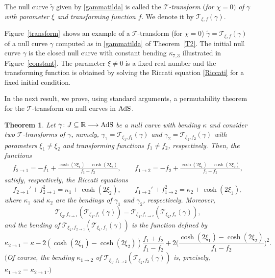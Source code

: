 \documentclass[10pt,a4paper]{amsart}
\numberwithin{equation}{section}
\newtheorem{Theorem}{Theorem}[section]
\def\bending{\kappa}
\def\R{\mathbb{R}}
\def\AdS{{\rm AdS}}
\begin{document}
\begin{Definition} The null curve $\widetilde{\gamma}$ given by \eqref{gammatilda} is called the \emph{$\mathcal{T}$-transform $($for $\chi=0)$ of $\gamma$ with parameter $\xi$ and transforming function $f$}. We denote it by $\mathcal{T}_{\xi,f}(\gamma)$.
\end{Definition}

Figure~\ref{transform} shows an example of a $\mathcal{T}$-transform (for $\chi=0$) $\widetilde{\gamma}=\mathcal{T}_{\xi,f}(\gamma)$ of a null curve $\gamma$ computed as in \eqref{gammatilda} of Theorem~\ref{T2}. The initial null curve $\gamma$ is the closed null curve with constant bending $\bending_{7,3}$ illustrated in Figure~\ref{constant}. The parameter $\xi\neq 0$ is a fixed real number and the transforming function is obtained by solving the Riccati equation \eqref{Riccati} for a fixed initial condition.

In the next result, we prove, using standard arguments, a permutability theorem for the $\mathcal{T}$-transform on null curves in $\AdS$.


\begin{Theorem}\label{T3} Let $\gamma\colon J\subseteq\R\longrightarrow\AdS$ be a null curve with bending $\bending$ and consider two $\mathcal{T}$-transforms of $\gamma$, namely, $\gamma_1=\mathcal{T}_{\xi_1,f_1}(\gamma)$ and $\gamma_2=\mathcal{T}_{\xi_2,f_2}(\gamma)$ with parameters $\xi_1\neq\xi_2$ and transforming functions $f_1\neq f_2$, respectively. Then, the functions
	\begin{gather*}
		f_{2\to 1}=-f_1+\frac{\cosh(2\xi_1)-\cosh(2\xi_2)}{f_1-f_2},\qquad
		f_{1\to 2}=-f_2+\frac{\cosh(2\xi_1)-\cosh(2\xi_2)}{f_1-f_2},
	\end{gather*}
	satisfy, respectively, the Riccati equations
	\begin{equation*}
		f_{2\to 1}'+f_{2\to 1}^2=\bending_1+\cosh(2\xi_2),\qquad
		f_{1\to 2}'+f_{1\to 2}^2=\bending_2+\cosh(2\xi_1),
	\end{equation*}
	where $\bending_1$ and $\bending_2$ are the bendings of $\gamma_1$ and $\gamma_2$, respectively. Moreover,
	\begin{equation*}%
		\mathcal{T}_{\xi_2,f_{2\to 1}}(\mathcal{T}_{\xi_1,f_1}(\gamma))=\mathcal{T}_{\xi_1,f_{1\to 2}}(\mathcal{T}_{\xi_2,f_2}(\gamma)),
	\end{equation*}
	and the bending of $\mathcal{T}_{\xi_2,f_{2\to 1}}(\mathcal{T}_{\xi_1,f_1}(\gamma))$ is the function defined by
	\begin{equation*}%
		\bending_{2\to 1}=\bending-2(\cosh(2\xi_1)-\cosh(2\xi_2))\frac{f_1+f_2}{f_1-f_2}+2\biggl(\frac{\cosh(2\xi_1)-\cosh(2\xi_2)}{f_1-f_2}\biggr)^2.
	\end{equation*}
	$($Of course, the bending $\bending_{1\to 2}$ of $\mathcal{T}_{\xi_1,f_{1\to 2}}(\mathcal{T}_{\xi_2,f_2}(\gamma))$ is, precisely, $\bending_{1\to 2}=\bending_{2\to 1}$.$)$
\end{Theorem}
\end{document}
